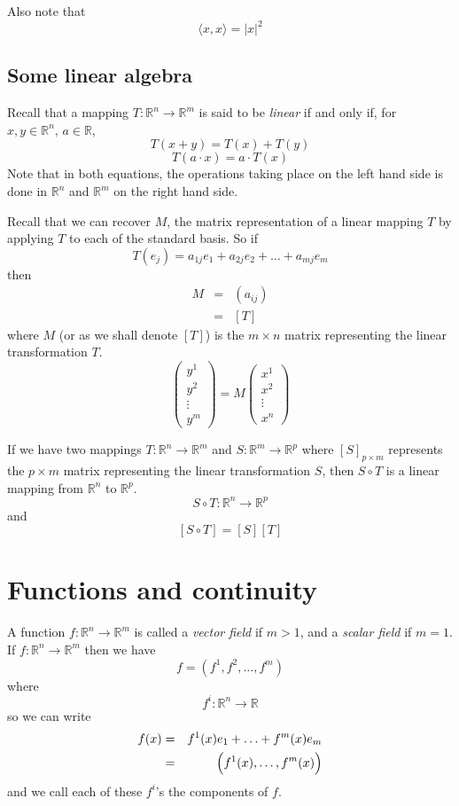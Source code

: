 \documentclass[a4paper,14pt]{extarticle}
\theoremstyle{definition}
\begin{document}
Also note that \[\langle x,x\rangle = |x|^2\]

\subsection{Some linear algebra}
Recall that a mapping $T:\mathbb{R}^n\rightarrow\mathbb{R}^m$ is said to be \emph{linear} if and only if, for $x,y\in\mathbb{R}^n, \,a\in\mathbb{R}$,
\[T(x+y)=T(x)+T(y)\]\[T(a\cdot  x)=a\cdot T(x)\] Note that in both equations, the operations taking place on the left hand side is done in $\mathbb{R}^n$ and $\mathbb{R}^m$
on the right hand side.

\noindent Recall that we can recover $M$, the matrix representation of a linear mapping $T$ by applying $T$ to each of the standard basis. So if
\[T(e_j)=a_{1j}e_1+a_{2j}e_2+\ldots+a_{mj}e_m\]
then
\begin{eqnarray*}
	M&=&(a_{ij}) \\
	&=&[T]
\end{eqnarray*}
where $M$ (or as we shall denote $[T]$) is the $m\times n$ matrix representing the linear transformation $T$.
\[\begin{pmatrix}y^1\\y^2\\\vdots\\y^m\end{pmatrix}=M\begin{pmatrix}x^1\\x^2\\\vdots\\x^n\end{pmatrix}\]

\noindent If we have two mappings $T:\mathbb{R}^n\rightarrow\mathbb{R}^m$ and $S:\mathbb{R}^m\rightarrow\mathbb{R}^p$ where $[S]_{p\times m}$ represents the
$p\times m$ matrix representing the linear transformation $S$, then $S\circ T$ is a linear mapping from $\mathbb{R}^n$ to $\mathbb{R}^p$.
\[S\circ T:\mathbb{R}^n\rightarrow\mathbb{R}^p\] and \[[S\circ T]=[S][T]\]

\section{Functions and continuity}
A function $f:\mathbb{R}^n\rightarrow\mathbb{R}^m$ is called a \emph{vector field} if $m>1$, and a \emph{scalar field} if $m=1$. \\

If $f:\mathbb{R}^n\rightarrow\mathbb{R}^m$ then we have \[f=(f^1,f^2,\ldots,f^m)\] where \[f^i:\mathbb{R}^n\rightarrow\mathbb{R}\] so we can write
\begin{eqnarray*}
	f(x)&=&f^1(x)e_1+\ldots+f^m(x)e_m \\
		&=&\Bigl(f^1(x),\ldots,f^m(x)\Bigr)
\end{eqnarray*}
and we call each of these $f^i$'s the components of $f$.
\end{document}
